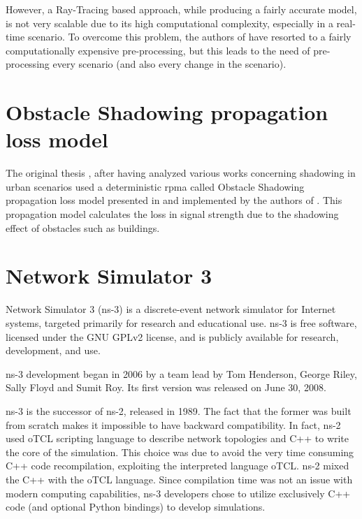 		
		However, a Ray-Tracing based approach, while producing a fairly accurate model, is not very scalable due to its high computational complexity, especially in a real-time scenario. To overcome this problem, the authors of \cite{STEPANOV200861} have resorted to a fairly computationally expensive pre-processing, but this leads to the need of pre-processing every scenario (and also every change in the scenario).
		
		
	
	\section{Obstacle Shadowing propagation loss model}
		The original thesis \cite{ROM2017}, after having analyzed various works concerning shadowing in urban scenarios \cite{Giordano:2010:CST:1860058.1860065} \cite{4020783} used a deterministic \gls{rpma} called Obstacle Shadowing propagation loss model presented in \cite{5720204} and implemented by the authors of \cite{Carpenter:2015:OMI:2756509.2756512}.  This propagation model calculates the loss in signal strength due to the shadowing effect of obstacles such as buildings. 
	
	\section{Network Simulator 3}
		Network Simulator 3 (ns-3) is a discrete-event network simulator for Internet systems, targeted primarily for research and educational use. ns-3 is free software, licensed under the GNU GPLv2 license, and is publicly available for research, development, and use.
		
		
		ns-3 development began in 2006 by a team lead by Tom Henderson, George Riley, Sally Floyd and Sumit Roy. Its first version was released on June 30, 2008. 
		
		
		ns-3 is the successor of ns-2, released in 1989. The fact that the former was built from scratch makes it impossible to have backward compatibility. In fact, ns-2 used oTCL scripting language to describe network topologies and C++ to write the core of the simulation. This choice was due to avoid the very time consuming C++ code recompilation, exploiting the interpreted language oTCL. ns-2 mixed the  C++ with the  oTCL language. Since compilation time was not an issue with modern computing capabilities, ns-3 developers chose to utilize exclusively C++ code (and optional Python bindings) to develop simulations.
	
